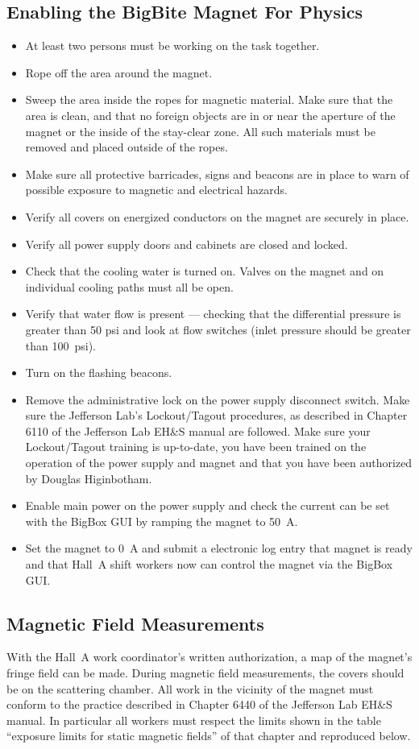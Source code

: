 \subsection{Enabling the BigBite Magnet For Physics}

\begin{itemize}
\item{At least two persons must be working on the task together.}
\item{Rope off the area around the magnet.}
\item{Sweep the area inside the ropes for magnetic material.  Make sure that the area is clean,
and that no foreign objects are in or near the aperture of the magnet or the inside of the stay-clear zone.
All such materials must be removed and placed outside of the ropes.}
\item{Make sure all protective barricades, signs and beacons are in place to warn of possible exposure
to magnetic and electrical hazards.}
\item{Verify all covers on energized conductors on the magnet are securely in place.}
\item{Verify all power supply doors and cabinets are closed and locked.}
\item{Check that the cooling water is turned on.  Valves on the magnet and on individual cooling paths must all
be open.}
\item{Verify that water flow is present --- checking that the differential pressure is greater than 50 psi and 
look at flow switches (inlet pressure should be greater than 100~psi).}
\item{Turn on the flashing beacons.}
\item{Remove the administrative lock on the power supply disconnect switch.  Make sure the Jefferson Lab's
Lockout/Tagout procedures, as described in Chapter 6110 of the Jefferson Lab EH\&S manual are followed.
Make sure your Lockout/Tagout training is up-to-date, you have been trained on the operation of the power
supply and magnet and that you have been authorized by Douglas Higinbotham.}
\item{Enable main power on the power supply and check the current can be set with the BigBox GUI by ramping
the magnet to 50~A.}
\item{Set the magnet to 0~A and submit a electronic log entry that magnet is ready
and that Hall~A shift workers now can control the magnet via the BigBox GUI.}
\end{itemize}

\subsection{Magnetic Field Measurements}
\label{guideline-mapping}
With the Hall~A work coordinator's written authorization, a map of the magnet's fringe
field can be made.  During magnetic field measurements, the covers should be on the
scattering chamber.  All work in the vicinity of the magnet must conform 
to the practice described in Chapter
6440 of the Jefferson Lab EH\&S manual.  In particular 
all workers must respect the limits shown in the table
``exposure limits for static magnetic fields'' of that chapter and reproduced below.  

